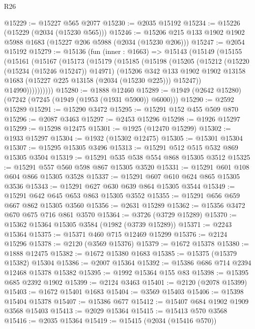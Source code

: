 \begin{lexlean}{R26}
\begin{coremodule}
@15229 := @15227 @565 @2077
@15230 := @2035 @15192
@15234 := @15226 (@15229 (@2034 (@15230 @565)))
@15246 := @15206 @215 @133 @1902 @1902 @5988 @1683 (@15227 @206 @5988 (@2034 (@15230 @206)))
@15247 := @2054 @15192
@15279 := @15136
    (fun (inner : @1663) =>
    @15143
      (@15149
        (@15155
          (@15161
            (@15167
              (@15173
                (@15179
                  (@15185
                    (@15198
                      (@15205
                        (@15212
                          (@15220 (@15234 (@15246 @15247)) @14971)
                          (@15206
                            @342
                            @133
                            @1902
                            @1902
                            @13158
                            @1683
                            (@15227 @225 @13158 (@2034 (@15230 @225)))
                            @15247))
                        @14990))))))))))
@15280 := @1888 @12460
@15289 := @1949 (@2642 @15280) (@7242 (@7245 (@1949 (@1953 (@1931 @5900)) @6000)))
@15290 := @2592 @15289
@15291 := @15290 @3472
@15295 := @15291 @152 @455 @509 @870
@15296 := @2087 @3463
@15297 := @2453 @15296
@15298 := @1926 @15297
@15299 := @15298 @12475
@15301 := @1925 (@12470 @15299)
@15302 := @1933 @15297
@15304 := @1932 (@15302 @12475)
@15305 := @15301 @15304
@15307 := @15295 @15305 @3496
@15313 := @15291 @512 @515 @532 @869 @15305 @3504
@15319 := @15291 @535 @538 @554 @868 @15305 @3512
@15325 := @15291 @557 @560 @598 @867 @15305 @3520
@15331 := @15291 @601 @108 @604 @866 @15305 @3528
@15337 := @15291 @607 @610 @624 @865 @15305 @3536
@15343 := @15291 @627 @630 @639 @864 @15305 @3544
@15349 := @15291 @642 @645 @653 @863 @15305 @3552
@15355 := @15291 @656 @659 @667 @862 @15305 @3560
@15356 := @2631 @15289
@15362 := @15356 @3472 @670 @675 @716 @861 @3570
@15364 := @3726 (@3729 @15289)
@15370 := @15362 @15364 @15305 @3584 (@1982 (@3739 @15289))
@15371 := @2243 @15364
@15375 := @15371 @460 @715 @12469 @15299
@15376 := @2124 @15296
@15378 := @2120 (@3569 @15376)
@15379 := @1672 @15378
@15380 := @1888 @12475
@15382 := @1672 @15380 @1683
@15385 := @15375 (@15379 @15382) @15304
@15386 := @2007 @15364
@15392 := @15386 @686 @714 @2394 @12468 @15378 @15382
@15395 := @1992 @15364 @155 @83
@15398 := @15395 @685 @2392 @1902
@15399 := @2124 @3463
@15401 := @2120 (@2078 @15399)
@15403 := @1672 @15401 @1683
@15404 := @3569 @15403
@15406 := @15398 @15404 @15378
@15407 := @15386 @677
@15412 := @15407 @684 @1902 @1909 @3568 @15403
@15413 := @2029 @15364
@15415 := @15413 @570 @3568
@15416 := @2035 @15364
@15419 := @15415 (@2034 (@15416 @570))

\end{coremodule}
\end{lexlean}
